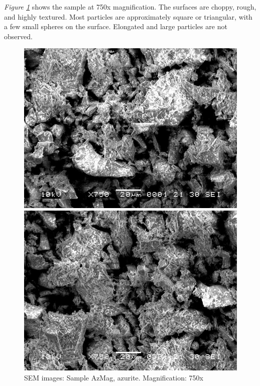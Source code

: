 \textit{Figure \ref{fig:azmag_sem_2}} shows the sample at 750x magnification. The surfaces are choppy, rough, and highly textured. Most particles are approximately square or triangular, with a few small spheres on the surface. Elongated and large particles are not observed.

\begin{figure}[H]
\centering
\begin{minipage}{.45\textwidth}
  \centering
  \includegraphics[width=\linewidth]{AzMag_x750_1_160321}
\end{minipage}
\begin{minipage}{.45\textwidth}
  \centering
  \includegraphics[width=\linewidth]{AzMag_x750_3_160321}
\end{minipage}
\caption[SEM images: Sample AzMag, azurite]{SEM images: Sample AzMag, azurite. Magnification: 750x}
\label{fig:azmag_sem_2}
\end{figure}

